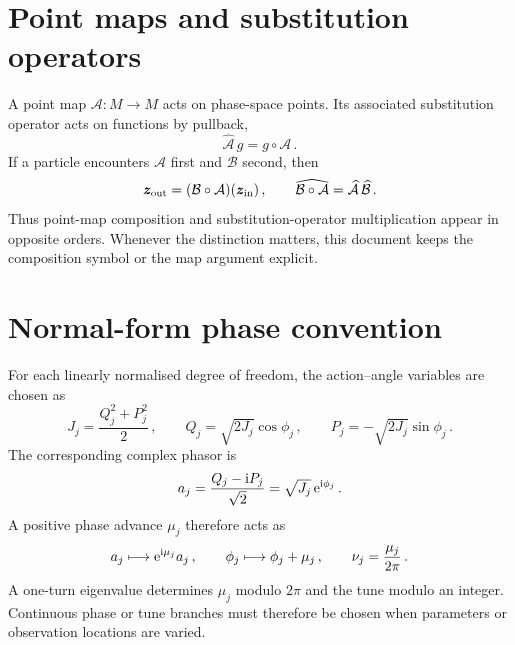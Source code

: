 \section{Point maps and substitution operators}

A point map $\mathcal A:M\to M$ acts on phase-space points.  Its associated
substitution operator acts on functions by pullback,
\begin{equation}\label{eq:conv-substitution}
    \widehat{\mathcal A}\,g = g\circ\mathcal A\,.
\end{equation}
If a particle encounters $\mathcal A$ first and $\mathcal B$ second, then
\begin{equation}\label{eq:conv-map-order}
    \vec z_{\rm out} = (\mathcal B\circ\mathcal A)(\vec z_{\rm in})\,,
    \qquad
    \widehat{\mathcal B\circ\mathcal A} = \widehat{\mathcal A}\,\widehat{\mathcal B}\,.
\end{equation}
Thus point-map composition and substitution-operator multiplication appear in
opposite orders.  Whenever the distinction matters, this document keeps the
composition symbol or the map argument explicit.



\section{Normal-form phase convention}

For each linearly normalised degree of freedom, the action--angle variables are
chosen as
\begin{equation}\label{eq:conv-action-angle}
    J_j = \frac{Q_j^2 + P_j^2}{2}\,,
    \qquad
    Q_j = \sqrt{2J_j}\cos\phi_j\,,
    \qquad
    P_j = -\sqrt{2J_j}\sin\phi_j\,.
\end{equation}
The corresponding complex phasor is
\begin{equation}\label{eq:conv-phasor}
    a_j = \frac{Q_j-\ii P_j}{\sqrt 2} = \sqrt{J_j}\,\e^{\ii\phi_j}\,.
\end{equation}
A positive phase advance $\mu_j$ therefore acts as
\begin{equation}\label{eq:conv-phase-advance}
    a_j \longmapsto \e^{\ii\mu_j}a_j\,,
    \qquad
    \phi_j \longmapsto \phi_j + \mu_j\,,
    \qquad
    \nu_j = \frac{\mu_j}{2\pi}\,.
\end{equation}
A one-turn eigenvalue determines $\mu_j$ modulo $2\pi$ and the tune modulo an
integer.  Continuous phase or tune branches must therefore be chosen when
parameters or observation locations are varied.



